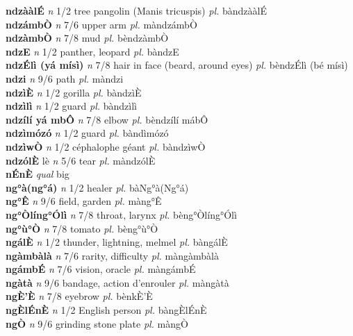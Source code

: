 \documentclass{article}
\newlength\cus
\begin{document}
{\bf ndzààlÉ}  {\it n} 1/2 tree pangolin (Manis tricuspis) {\it pl.} bàndzààlÉ         \\ 
{\bf ndzámbÒ}  {\it n} 7/6 upper arm {\it pl.} màndzámbÒ         \\ 
{\bf ndzàmbÒ}  {\it n} 7/8 mud {\it pl.} bèndzàmbÒ         \\ 
{\bf ndzE}  {\it n} 1/2 panther, leopard {\it pl.} bàndzE         \\ 
{\bf ndzÉlì (yá mísì)}  {\it n} 7/8 hair in face (beard, around eyes) {\it pl.} bèndzÉlì (bé mísì)         \\ 
{\bf ndzi}  {\it n} 9/6 path {\it pl.} màndzi         \\ 
{\bf ndzìÈ}  {\it n} 1/2 gorilla {\it pl.} bàndzìÈ         \\ 
{\bf ndzìlì}  {\it n} 1/2 guard {\it pl.} bàndzìlì         \\ 
{\bf ndzílí yá mbÔ}  {\it n} 7/8 elbow {\it pl.} bèndzílí mábÔ         \\ 
{\bf ndzìmózó}  {\it n} 1/2 guard {\it pl.} bàndìmózó         \\ 
{\bf ndzìwÒ}  {\it n} 1/2 céphalophe géant {\it pl.} bàndzìwÒ         \\ 
{\bf ndzólÈ} lè {\it n} 5/6 tear {\it pl.} màndzólÈ         \\ 
{\bf nÉnÈ}  {\it qual} big         \\ 
{\bf ng°à(ng°á)}  {\it n} 1/2 healer {\it pl.} bàNg°à(Ng°á)         \\ 
{\bf ng°Ê}  {\it n} 9/6 field, garden {\it pl.} màng°Ê         \\ 
{\bf ng°Òlíng°Ólì}  {\it n} 7/8 throat, larynx {\it pl.} bèng°Òlíng°Ólì         \\ 
{\bf ng°ù°Ò}  {\it n} 7/8 tomato {\it pl.} bèng°ù°Ò         \\ 
{\bf ngálÈ}  {\it n} 1/2 thunder, lightning, melmel {\it pl.} bàngálÈ         \\ 
{\bf ngàmbàlà}  {\it n} 7/6 rarity, difficulty {\it pl.} màngàmbàlà         \\ 
{\bf ngámbÉ}  {\it n} 7/6 vision, oracle {\it pl.} màngámbÉ         \\ 
{\bf ngàtà}  {\it n} 9/6 bandage, action d'enrouler {\it pl.} màngàtà         \\ 
{\bf ngÈ'È}  {\it n} 7/8 eyebrow {\it pl.} bènkÈ'È         \\ 
{\bf ngÈlÉnÈ}  {\it n} 1/2 English person {\it pl.} bàngÈlÉnÈ         \\ 
{\bf ngÒ}  {\it n} 9/6 grinding stone plate {\it pl.} màngÒ         \\ 
\end{document}
